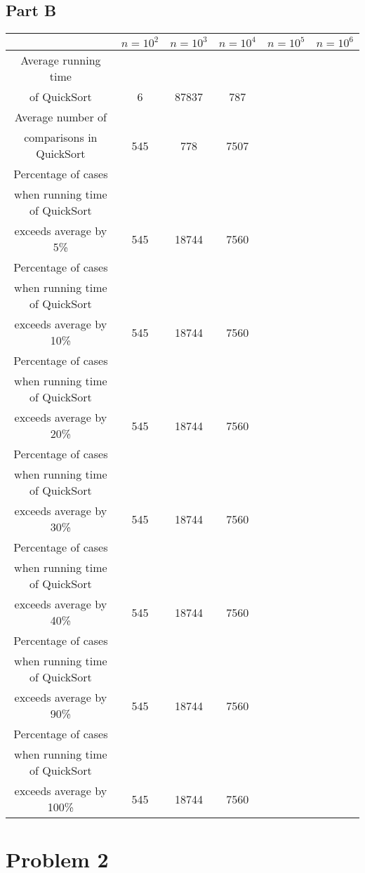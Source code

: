 \documentclass[a4paper,11pt]{article}
\theoremstyle{mytheor}
\begin{document}
\subsection*{Part B}
\begin{center}
 \begin{tabular}{||c c c c c c||} 
 \hline
  & $n = 10^2$ & $n = 10^3$ & $n = 10^4$ & $n = 10^5$ & $n = 10^6$\\ [0.5ex] 
 \hline\hline
 Average running time \\of QuickSort & 6 & 87837 & 787 & &\\ 
 \hline
 Average number of \\comparisons in
QuickSort & 545 & 778 & 7507 & &\\
 \hline
Percentage of cases \\when running time
of QuickSort \\exceeds average by 5\% & 545 & 18744 & 7560 & &\\
 \hline
 Percentage of cases \\when running time
of QuickSort \\exceeds average by 10\% & 545 & 18744 & 7560 & &\\
 \hline
 Percentage of cases \\when running time
of QuickSort \\exceeds average by 20\% & 545 & 18744 & 7560 & &\\
 \hline
 Percentage of cases \\when running time
of QuickSort \\exceeds average by 30\% & 545 & 18744 & 7560 & &\\
 \hline
 Percentage of cases \\when running time
of QuickSort \\exceeds average by 40\% & 545 & 18744 & 7560 & &\\
 \hline
 Percentage of cases \\when running time
of QuickSort \\exceeds average by 90\% & 545 & 18744 & 7560 & &\\
 \hline
 Percentage of cases \\when running time
of QuickSort \\exceeds average by 100\% & 545 & 18744 & 7560 & &\\
 \hline
\end{tabular}
\end{center}

\section*{Problem 2}
\end{document}
